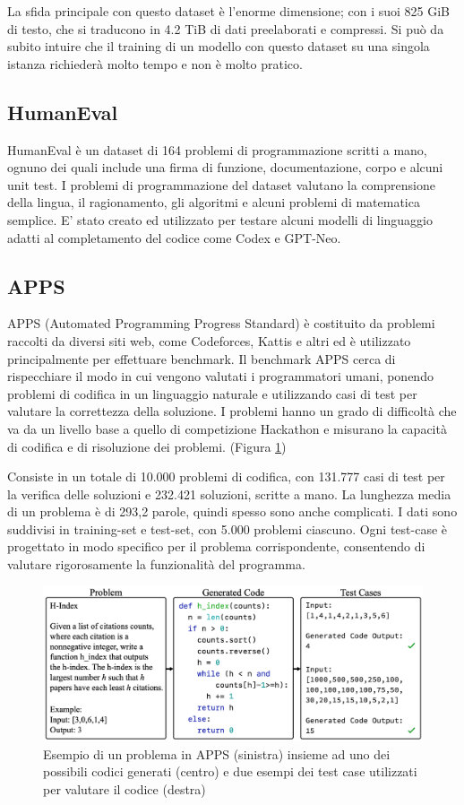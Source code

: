 La sfida principale con questo dataset è l'enorme dimensione; con i suoi 825 GiB di testo, che si traducono in 4.2 TiB di dati preelaborati e compressi. Si può da subito intuire che il training di un modello con questo dataset su una singola istanza richiederà molto tempo e non è molto pratico.
\newpage
\subsection{HumanEval}
HumanEval è un dataset di 164 problemi di programmazione scritti a mano, ognuno dei quali include una firma di funzione, documentazione, corpo e alcuni unit test. I problemi di programmazione del dataset valutano la comprensione della lingua, il ragionamento, gli algoritmi e alcuni problemi di matematica semplice. \cite{https://doi.org/10.48550/arxiv.2107.03374}
E' stato creato ed utilizzato per testare alcuni modelli di linguaggio adatti al completamento del codice come Codex e GPT-Neo.
\subsection{APPS}
APPS (Automated Programming Progress Standard) è costituito da problemi raccolti da diversi siti web, come Codeforces, Kattis e altri ed è utilizzato principalmente per effettuare benchmark. Il benchmark APPS cerca di rispecchiare il modo in cui vengono valutati i programmatori umani, ponendo problemi di codifica in un linguaggio naturale e utilizzando casi di test per valutare la correttezza della soluzione. I problemi hanno un grado di difficoltà che va da un livello base a quello di competizione Hackathon e misurano la capacità di codifica e di risoluzione dei problemi. (Figura \ref{fig_apps})

Consiste in un totale di 10.000 problemi di codifica, con 131.777 casi di test per la verifica delle soluzioni e 232.421 soluzioni, scritte a mano. La lunghezza media di un problema è di 293,2 parole, quindi spesso sono anche complicati. I dati sono suddivisi in training-set e test-set, con 5.000 problemi ciascuno. Ogni test-case è progettato in modo specifico per il problema corrispondente, consentendo di valutare rigorosamente la funzionalità del programma.\cite{DBLP:journals/corr/abs-2105-09938}
\begin{figure}[h!]
\centerline{\includegraphics[scale=.40]{immagini/apps_example.png}}
\caption{Esempio di un problema in APPS (sinistra) insieme ad uno dei possibili codici generati (centro) e due esempi dei test case utilizzati per valutare il codice (destra)}
\label{fig_apps}
\end{figure}
\newpage

